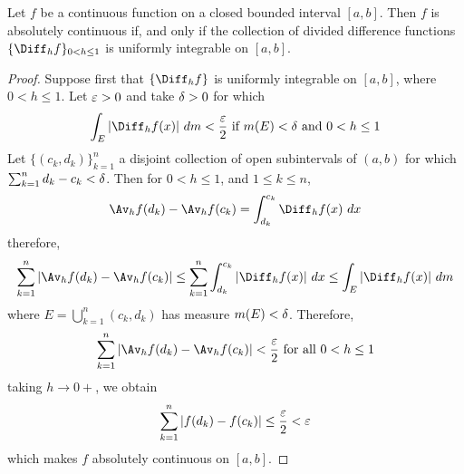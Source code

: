 \begin{theorem}\label{11.3.4}
    Let $f$ be a continuous function on a closed bounded interval $[a,b]$. Then
    $f$ is absolutely continuous if, and only if the collection of divided
    difference functions  $\{\Diff_h{f}\}_{0<h \leq 1}$ is uniformly integrable
    on $[a,b]$.
\end{theorem}
\begin{proof}
    Suppose first that $\{\Diff_h{f}\}$ is uniformly integrable on $[a,b]$,
    where $0<h \leq 1$. Let  $\varepsilon>0$ and take $\delta>0$ for which
    \begin{equation*}
        \int_E{|\Diff_h{f(x)}| \ dm}<\frac{\e}{2} \text{ if } m(E)<\d \text{ and }
        0<h \leq 1
    \end{equation*}
    Let $\{(c_k,d_k)\}_{k=1}^n$ a disjoint collection of open subintervals of
    $(a,b)$ for which $\sum_{k=1}^n{d_k-c_k}<\delta$. Then for $0<h \leq 1$, and  $1
    \leq k \leq n$,
    \begin{equation*}
        \Av_h{f(d_k)}-\Av_h{f(c_k)}=\int_{d_k}^{c_k}{\Diff_h{f(x)} \ dx}
    \end{equation*}
    therefore,
    \begin{equation*}
        \sum_{k=1}^n{|\Av_h{f(d_k)}-\Av_h{f(c_k)}|} \leq
        \sum_{k=1}^n{\int_{d_k}^{c_k}{|\Diff_h{f(x)}| \ dx}} \leq
        \int_E{|\Diff_h{f(x)}| \ dm}
    \end{equation*}
    where $E=\bigcup_{k=1}^n{(c_k,d_k)}$ has measure $m(E)<\delta$. Therefore,
    \begin{equation*}
        \sum_{k=1}^n{|\Av_h{f(d_k)}-\Av_h{f(c_k)}|}<\frac{\e}{2} \text{ for all
        } 0<h \leq 1
    \end{equation*}
    taking $h \xrightarrow{} 0+$, we obtain
    \begin{equation*}
        \sum_{k=1}^n{|f(d_k)-f(c_k)|} \leq \frac{\varepsilon}{2}<\varepsilon
    \end{equation*}
    which makes $f$ absolutely continuous on $[a,b]$.


\end{proof}
